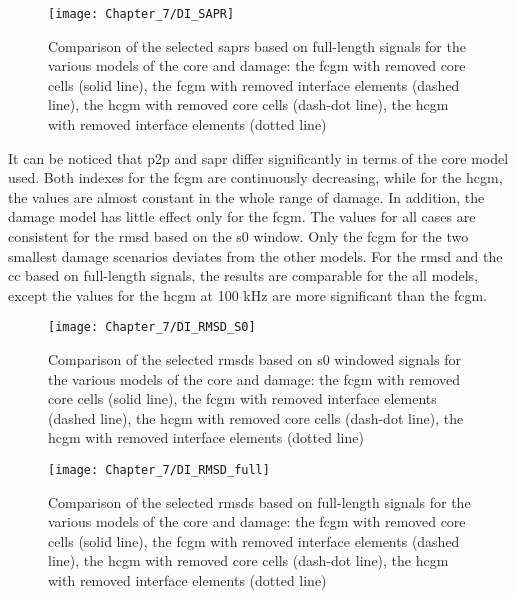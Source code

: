 \begin{figure}[!tbh]
	\begin{center}
		\texttt{[image: Chapter\_7/DI\_SAPR]}
	\end{center}
	\caption{Comparison of the selected \acfp{sapr} based on full-length signals for the various models of the core and damage: the \acf{fcgm} with removed core cells (solid line), the \ac{fcgm} with removed interface elements (dashed line), the \acf{hcgm} with removed core cells (dash-dot line), the \ac{hcgm} with removed interface elements (dotted line)}
	\label{fig:DI_SAPR}
\end{figure}
It can be noticed that \ac{p2p} and \ac{sapr} differ significantly in terms of the core model used. Both indexes for the \ac{fcgm} are continuously decreasing, while for the \ac{hcgm}, the values are almost constant in the whole range of damage.
In addition, the damage model has little effect only for the \ac{fcgm}.
The values for all cases are consistent for the \ac{rmsd} based on the \ac{s0} window.
Only the \ac{fcgm} for the two smallest damage scenarios deviates from the other models.
For the \ac{rmsd} and the \ac{cc} based on full-length signals, the results are comparable for the all models, except the values for the \ac{hcgm} at 100 \unit{kHz} are more significant than the \ac{fcgm}.
\begin{figure}[!tbh]
	\begin{center}
		\texttt{[image: Chapter\_7/DI\_RMSD\_S0]}
	\end{center}
	\caption{Comparison of the selected \acfp{rmsd} based on \ac{s0} windowed signals for the various models of the core and damage: the \acf{fcgm} with removed core cells (solid line), the \ac{fcgm} with removed interface elements (dashed line), the \acf{hcgm} with removed core cells (dash-dot line), the \ac{hcgm} with removed interface elements (dotted line)}
	\label{fig:DI_RMSD_S0}
\end{figure}

\begin{figure}[!tbh]
	\begin{center}
		\texttt{[image: Chapter\_7/DI\_RMSD\_full]}
	\end{center}
	\caption{Comparison of the selected \acfp{rmsd} based on full-length signals for the various models of the core and damage: the \acf{fcgm} with removed core cells (solid line), the \ac{fcgm} with removed interface elements (dashed line), the \acf{hcgm} with removed core cells (dash-dot line), the \ac{hcgm} with removed interface elements (dotted line)}
	\label{fig:DI_RMSD_full}
\end{figure}

